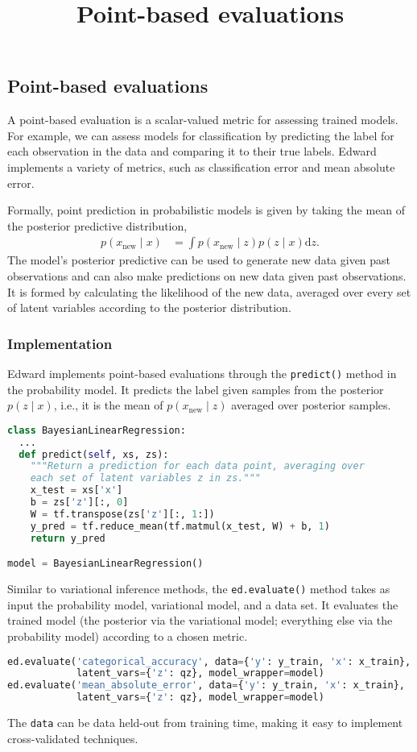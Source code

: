 \title{Point-based evaluations}

\subsection{Point-based evaluations}

A point-based evaluation is a scalar-valued metric for assessing
trained models. For example, we can assess models for classification
by predicting the label for each observation in the data and comparing
it to their true labels. Edward implements a variety of metrics, such
as classification error and mean absolute error.

Formally, point prediction in probabilistic models is given by
taking the mean of the posterior predictive distribution,
\begin{align*}
  p(x_\text{new} \mid x)
  &=
  \int
  p(x_\text{new} \mid z)
  p(z \mid x)
  \text{d} z.
\end{align*}
The model's posterior predictive can be used to generate new data
given past observations and can also make predictions on new data
given past observations.
It is formed by calculating the likelihood of the new data, averaged
over every set of latent variables according to the posterior
distribution.

\subsubsection{Implementation}

Edward implements point-based evaluations through the
\texttt{predict()} method in the probability model. It predicts the
label given samples from the posterior $p(z \mid x)$, i.e., it is the
mean of $p(x_\text{new} \mid z)$ averaged over posterior samples.
\begin{lstlisting}[language=Python]
class BayesianLinearRegression:
  ...
  def predict(self, xs, zs):
    """Return a prediction for each data point, averaging over
    each set of latent variables z in zs."""
    x_test = xs['x']
    b = zs['z'][:, 0]
    W = tf.transpose(zs['z'][:, 1:])
    y_pred = tf.reduce_mean(tf.matmul(x_test, W) + b, 1)
    return y_pred

model = BayesianLinearRegression()
\end{lstlisting}
Similar to variational inference methods, the
\texttt{ed.evaluate()} method takes as input the probability model,
variational model, and a data set. It evaluates the trained model (the
posterior via the variational model; everything else via the
probability model) according to a chosen metric.
\begin{lstlisting}[language=Python]
ed.evaluate('categorical_accuracy', data={'y': y_train, 'x': x_train},
            latent_vars={'z': qz}, model_wrapper=model)
ed.evaluate('mean_absolute_error', data={'y': y_train, 'x': x_train},
            latent_vars={'z': qz}, model_wrapper=model)
\end{lstlisting}
The \texttt{data} can be data held-out from training time, making it
easy to implement cross-validated techniques.

